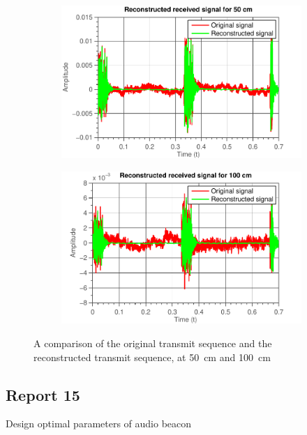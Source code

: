 \documentclass[11pt,titlepage]{report}
\begin{document}
\begin{figure}[H]
	\centering
	\begin{subfigure}{0.49\textwidth}
		\includegraphics[width=\textwidth]{../../deliverable-7-resources/figures/ass-1/report-14-15/ass-1-report-14-50cm-reconstruction.pdf}
	\end{subfigure}
	\begin{subfigure}{0.49\textwidth}
		\includegraphics[width=\textwidth]{../../deliverable-7-resources/figures/ass-1/report-14-15/ass-1-report-14-100cm-reconstruction.pdf}
	\end{subfigure}
	\caption{A comparison of the original transmit sequence and the reconstructed transmit sequence, at \SI{50}{cm} and \SI{100}{cm}}
	\label{fig:rep14-comparison}
\end{figure}


\subsection{Report 15}
Design optimal parameters of audio beacon
\end{document}
